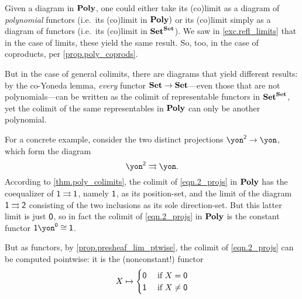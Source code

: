 \documentclass[Book-Poly]{subfiles}
\begin{document}
\begin{example}
Given a diagram in $\mathbf{Poly}$, one could either take its (co)limit as a diagram of \emph{polynomial} functors (i.e.\ its (co)limit in $\mathbf{Poly})$ or its (co)limit simply as a diagram of functors (i.e.\ its (co)limit in $\mathbf{Set}^{\mathbf{Set}}$).
We saw in \cref{exc.refl_limits} that in the case of limits, these yield the same result.
So, too, in the case of coproducts, per \cref{prop.poly_coprods}.

But in the case of general colimits, there are diagrams that yield different results: by the co-Yoneda lemma, \emph{every} functor $\mathbf{Set} \to \mathbf{Set}$---even those that are not polynomials---can be written as the colimit of representable functors in $\mathbf{Set}^{\mathbf{Set}}$, yet the colimit of the same representables in $\mathbf{Poly}$ can only be another polynomial.

For a concrete example, consider the two distinct projections $\yon^\2\to\yon$, which form the diagram
\begin{equation} \label{eqn.2_projs}
    \yon^\2\tto\yon.
\end{equation}
According to \cref{thm.poly_colimits}, the colimit of \eqref{eqn.2_projs} in $\mathbf{Poly}$ has the coequalizer of $\textsf{1} \rightrightarrows \textsf{1}$, namely $\textsf{1}$, as its position-set, and the limit of the diagram $\textsf{1} \rightrightarrows \textsf{2}$ consisting of the two inclusions as its sole direction-set.
But this latter limit is just $\textsf{0}$, so in fact the colimit of \eqref{eqn.2_projs} in $\mathbf{Poly}$ is the constant functor $\1\yon^\0\iso\1$.


But as functors, by \cref{prop.presheaf_lim_ptwise}, the colimit of \eqref{eqn.2_projs} can be computed pointwise: it is the (nonconstant!) functor
\[
  X\mapsto
  \begin{cases}
  	\textsf{0}&\textnormal{ if }X=\textsf{0}\\
  	\textsf{1}&\textnormal{ if }X\neq\textsf{0}
  \end{cases}
\]
\end{example}
\end{document}
